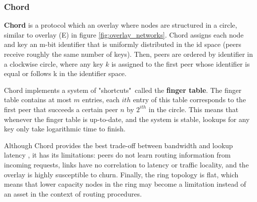 \subsubsection* {Chord}

\textbf{Chord} \cite{stoica2003chord} is a protocol which an overlay where nodes are structured in a circle, similar to overlay (E) in figure \ref{fig:overlay_networks}. Chord assigns each node and key an m-bit identifier that is uniformly distributed in the id space (peers receive roughly the same number of keys). Then, peers are ordered by identifier in a clockwise circle, where any key \(k\) is assigned to the first peer whose identifier is equal or follows k in the identifier space. 

Chord implements a system of "shortcuts"\ called the \textbf{finger table}. The finger table contains at most \(m\) entries, each $ith$ entry of this table corresponds to the first peer that succeeds a certain peer \(n\) by \(2^{ith}\) in the circle. This means that whenever the finger table is up-to-date, and the system is stable, lookups for any key only take logarithmic time to finish. 

Although Chord provides the best trade-off between bandwidth and lookup latency \cite{dht_performance_churn}, it has its limitations: peers do not learn routing information from incoming requests, links have no correlation to latency or traffic locality, and the overlay is highly susceptible to churn. Finally, the ring topology is flat, which means that lower capacity nodes in the ring may become a limitation instead of an asset in the context of routing procedures.




